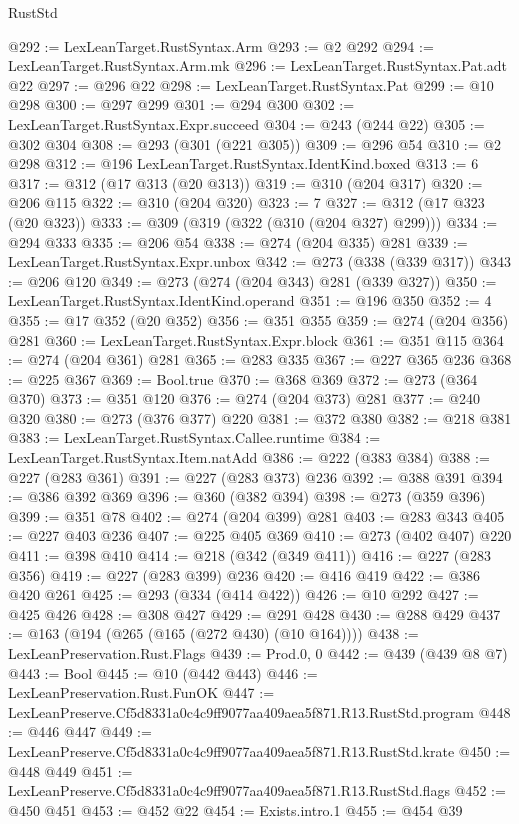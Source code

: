 \begin{lexlean}{RustStd}
\begin{coremodule}
@292 := LexLeanTarget.RustSyntax.Arm
@293 := @2 @292
@294 := LexLeanTarget.RustSyntax.Arm.mk
@296 := LexLeanTarget.RustSyntax.Pat.adt @22
@297 := @296 @22
@298 := LexLeanTarget.RustSyntax.Pat
@299 := @10 @298
@300 := @297 @299
@301 := @294 @300
@302 := LexLeanTarget.RustSyntax.Expr.succeed
@304 := @243 (@244 @22)
@305 := @302 @304
@308 := @293 (@301 (@221 @305))
@309 := @296 @54
@310 := @2 @298
@312 := @196 LexLeanTarget.RustSyntax.IdentKind.boxed
@313 := 6
@317 := @312 (@17 @313 (@20 @313))
@319 := @310 (@204 @317)
@320 := @206 @115
@322 := @310 (@204 @320)
@323 := 7
@327 := @312 (@17 @323 (@20 @323))
@333 := @309 (@319 (@322 (@310 (@204 @327) @299)))
@334 := @294 @333
@335 := @206 @54
@338 := @274 (@204 @335) @281
@339 := LexLeanTarget.RustSyntax.Expr.unbox
@342 := @273 (@338 (@339 @317))
@343 := @206 @120
@349 := @273 (@274 (@204 @343) @281 (@339 @327))
@350 := LexLeanTarget.RustSyntax.IdentKind.operand
@351 := @196 @350
@352 := 4
@355 := @17 @352 (@20 @352)
@356 := @351 @355
@359 := @274 (@204 @356) @281
@360 := LexLeanTarget.RustSyntax.Expr.block
@361 := @351 @115
@364 := @274 (@204 @361) @281
@365 := @283 @335
@367 := @227 @365 @236
@368 := @225 @367
@369 := Bool.true
@370 := @368 @369
@372 := @273 (@364 @370)
@373 := @351 @120
@376 := @274 (@204 @373) @281
@377 := @240 @320
@380 := @273 (@376 @377) @220
@381 := @372 @380
@382 := @218 @381
@383 := LexLeanTarget.RustSyntax.Callee.runtime
@384 := LexLeanTarget.RustSyntax.Item.natAdd
@386 := @222 (@383 @384)
@388 := @227 (@283 @361)
@391 := @227 (@283 @373) @236
@392 := @388 @391
@394 := @386 @392 @369
@396 := @360 (@382 @394)
@398 := @273 (@359 @396)
@399 := @351 @78
@402 := @274 (@204 @399) @281
@403 := @283 @343
@405 := @227 @403 @236
@407 := @225 @405 @369
@410 := @273 (@402 @407) @220
@411 := @398 @410
@414 := @218 (@342 (@349 @411))
@416 := @227 (@283 @356)
@419 := @227 (@283 @399) @236
@420 := @416 @419
@422 := @386 @420 @261
@425 := @293 (@334 (@414 @422))
@426 := @10 @292
@427 := @425 @426
@428 := @308 @427
@429 := @291 @428
@430 := @288 @429
@437 := @163 (@194 (@265 (@165 (@272 @430) (@10 @164))))
@438 := LexLeanPreservation.Rust.Flags
@439 := Prod.{0, 0}
@442 := @439 (@439 @8 @7)
@443 := Bool
@445 := @10 (@442 @443)
@446 := LexLeanPreservation.Rust.FunOK
@447 := LexLeanPreserve.Cf5d8331a0c4c9ff9077aa409aea5f871.R13.RustStd.program
@448 := @446 @447
@449 := LexLeanPreserve.Cf5d8331a0c4c9ff9077aa409aea5f871.R13.RustStd.krate
@450 := @448 @449
@451 := LexLeanPreserve.Cf5d8331a0c4c9ff9077aa409aea5f871.R13.RustStd.flags
@452 := @450 @451
@453 := @452 @22
@454 := Exists.intro.{1}
@455 := @454 @39

\end{coremodule}
\end{lexlean}
